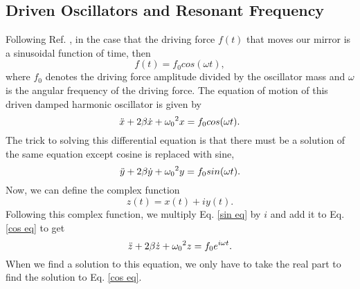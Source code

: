 \documentclass[11pt,letterpaper]{article}
\begin{document}
\subsection{Driven Oscillators and Resonant Frequency}

Following Ref. \cite{Taylor}, in the case that the driving force $f(t)$ that moves our mirror is a sinusoidal function of time, then
\begin{equation}
    f(t) = f_0 cos(\omega t) ,
\end{equation}
where $f_0$ denotes the driving force amplitude divided by the oscillator mass and $\omega$ is the angular frequency of the driving force. The equation of motion of this driven damped harmonic oscillator is given by
\begin{equation}
    \Ddot{x} + 2 \beta \Dot{x} + {\omega _0}^2 x = f_0 cos(\omega t) . \label{cos eq}
\end{equation}
 The trick to solving this differential equation is that there must be a solution of the same equation except cosine is replaced with sine,
\begin{equation}
    \Ddot{y} + 2 \beta \Dot{y} + {\omega _0}^2 y = f_0 sin(\omega t) . \label{sin eq}
\end{equation}
Now, we can define the complex function
\begin{equation}
    z(t) = x(t) + i y(t) .
\end{equation}
Following this complex function, we multiply Eq. \eqref{sin eq} by $i$ and add it to Eq. \eqref{cos eq} to get
\begin{equation}
    \Ddot{z} + 2 \beta \Dot{z} + {\omega _0}^2 z = f_0 e^{i \omega t} . \label{plugged in}
\end{equation}
When we find a solution to this equation, we only have to take the real part to find the solution to Eq. \eqref{cos eq}.
\end{document}
